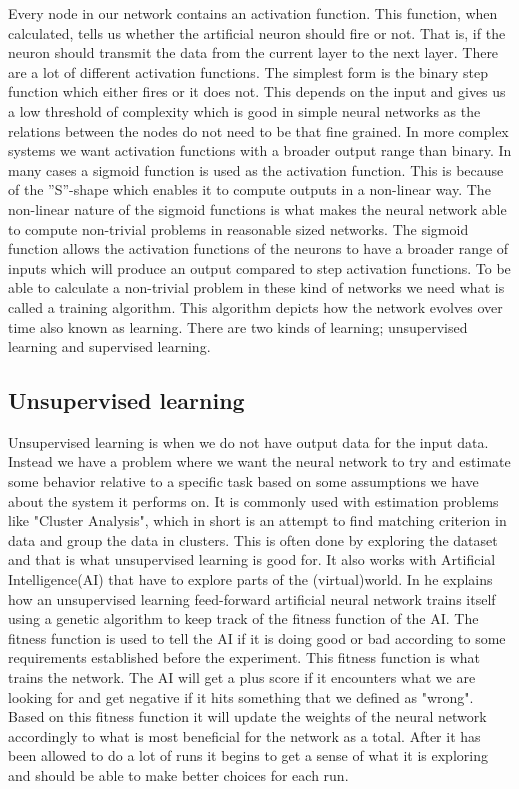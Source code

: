 Every node in our network contains an activation function. This function, when calculated, tells us whether the artificial neuron should fire or not. That is, if the neuron should transmit the data from the current layer to the next layer. There are a lot of different activation functions. The simplest form is the binary step function which either fires or it does not. This depends on the input and gives us a low threshold of complexity which is good in simple neural networks as the relations between the nodes do not need to be that fine grained. In more complex systems we want activation functions with a broader output range than binary. In many cases a sigmoid function is used as the activation function. This is because of the ''S''-shape which enables it to compute outputs in a non-linear way. The non-linear nature of the sigmoid functions is what makes the neural network able to compute non-trivial problems in reasonable sized networks. The sigmoid function allows the activation functions of the neurons to have a broader range of inputs which will produce an output compared to step activation functions. To be able to calculate a non-trivial problem in these kind of networks we need what is called a training algorithm. This algorithm depicts how the network evolves over time also known as learning. There are two kinds of learning; unsupervised learning and supervised learning.

\subsection{Unsupervised learning}
Unsupervised learning is when we do not have output data for the input data. Instead we have a problem where we want the neural network to try and estimate some behavior relative to a specific task based on some assumptions we have about the system it performs on. It is commonly used with estimation problems like "Cluster Analysis", which in short is an attempt to find matching criterion in data and group the data in clusters. This is often done by exploring the dataset and that is what unsupervised learning is good for. It also works with Artificial Intelligence(AI) that have to explore parts of the (virtual)world. In \cite{buckland2002ai} he explains how an unsupervised learning feed-forward artificial neural network trains itself using a genetic algorithm to keep track of the fitness function of the AI. The fitness function is used to tell the AI if it is doing good or bad according to some requirements established before the experiment. This fitness function is what trains the network. The AI will get a plus score if it encounters what we are looking for and get negative if it hits something that we defined as "wrong". Based on this fitness function it will update the weights of the neural network accordingly to what is most beneficial for the network as a total. After it has been allowed to do a lot of runs it begins to get a sense of what it is exploring and should be able to make better choices for each run.

